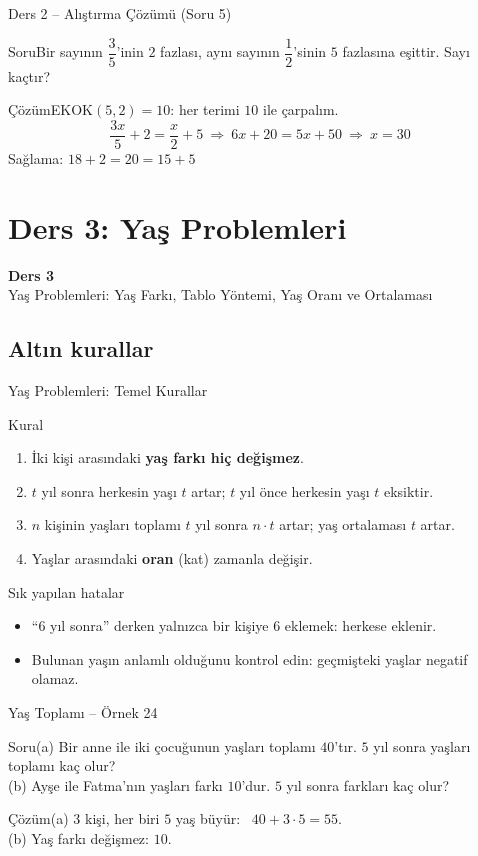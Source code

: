 \documentclass[aspectratio=169,11pt,handout]{beamer}
\newcommand{\soru}[3]{%
\begin{frame}{#1}
  \begin{block}{Soru}\large #2\end{block}
  \pause
  \begin{exampleblock}{Çözüm}\large #3\end{exampleblock}
\end{frame}}
\begin{document}
\soru{Ders 2 -- Alıştırma Çözümü (Soru 5)}
{Bir sayının \(\dfrac{3}{5}\)'inin \(2\) fazlası, aynı sayının \(\dfrac{1}{2}\)'sinin \(5\) fazlasına eşittir. Sayı kaçtır?}
{EKOK\((5,2)=10\): her terimi \(10\) ile çarpalım.
\[\frac{3x}{5}+2=\frac{x}{2}+5\ \Rightarrow\ 6x+20=5x+50\ \Rightarrow\ x=30\]
Sağlama: \(18+2=20=15+5\) \checkmark}


\section{Ders 3: Yaş Problemleri}
\begin{frame}
\centering\Large\color{anamavi}\textbf{Ders 3}\\[6pt]\normalsize Yaş Problemleri: Yaş Farkı, Tablo Yöntemi, Yaş Oranı ve Ortalaması
\end{frame}

\subsection{Altın kurallar}
\begin{frame}{Yaş Problemleri: Temel Kurallar}
\begin{block}{Kural}
\begin{enumerate}
\item İki kişi arasındaki \textbf{yaş farkı hiç değişmez}.
\item \(t\) yıl sonra herkesin yaşı \(t\) artar; \(t\) yıl önce herkesin yaşı \(t\) eksiktir.
\item \(n\) kişinin yaşları toplamı \(t\) yıl sonra \(n\cdot t\) artar; yaş ortalaması \(t\) artar.
\item Yaşlar arasındaki \textbf{oran} (kat) zamanla değişir.
\end{enumerate}
\end{block}
\begin{alertblock}{Sık yapılan hatalar}
\begin{itemize}
\item ``\(6\) yıl sonra'' derken yalnızca bir kişiye \(6\) eklemek: herkese eklenir.
\item Bulunan yaşın anlamlı olduğunu kontrol edin: geçmişteki yaşlar negatif olamaz.
\end{itemize}
\end{alertblock}
\end{frame}

\soru{Yaş Toplamı -- Örnek 24}
{(a) Bir anne ile iki çocuğunun yaşları toplamı \(40\)'tır. \(5\) yıl sonra yaşları toplamı kaç olur?\\
(b) Ayşe ile Fatma'nın yaşları farkı \(10\)'dur. \(5\) yıl sonra farkları kaç olur?}
{(a) \(3\) kişi, her biri \(5\) yaş büyür: \ \(40+3\cdot 5=55\).\\[4pt]
(b) Yaş farkı değişmez: \(10\).}
\end{document}
